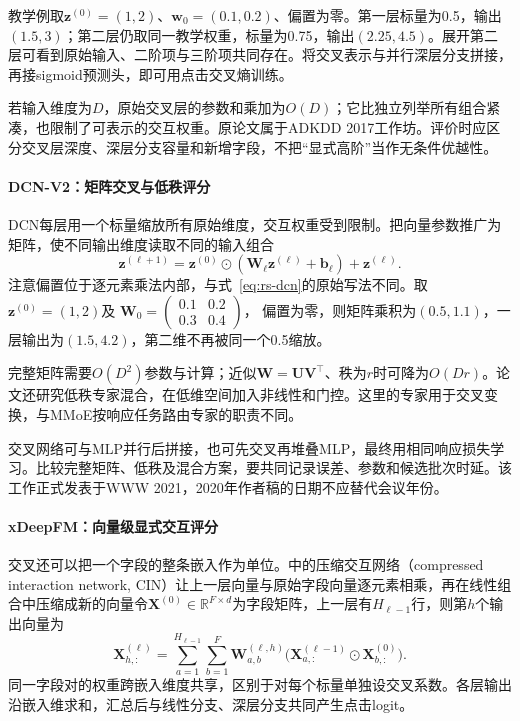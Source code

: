 教学例取$\bm z^{(0)}=(1,2)$、$\bm w_0=(0.1,0.2)$、偏置为零。第一层标量为0.5，输出$(1.5,3)$；第二层仍取同一教学权重，标量为0.75，输出$(2.25,4.5)$。展开第二层可看到原始输入、二阶项与三阶项共同存在。将交叉表示与并行深层分支拼接，再接sigmoid预测头，即可用点击交叉熵训练。

若输入维度为$D$，原始交叉层的参数和乘加为$O(D)$；它比独立列举所有组合紧凑，也限制了可表示的交互权重。原论文属于ADKDD 2017工作坊。评价时应区分交叉层深度、深层分支容量和新增字段，不把“显式高阶”当作无条件优越性。

\paragraph{DCN-V2：矩阵交叉与低秩评分}
\label{sec:rs-dcn-v2}

DCN每层用一个标量缩放所有原始维度，交互权重受到限制。把向量参数推广为矩阵，使不同输出维度读取不同的输入组合
\begin{equation}
 \bm z^{(\ell+1)}
 =\bm z^{(0)}\odot(\bm W_\ell\bm z^{(\ell)}+\bm b_\ell)
  +\bm z^{(\ell)}.
 \label{eq:rs-dcn-v2}
\end{equation}
注意偏置位于逐元素乘法内部，与式~\eqref{eq:rs-dcn}的原始写法不同。取$\bm z^{(0)}=(1,2)$及
$\bm W_0=\left(\begin{smallmatrix}0.1&0.2\\0.3&0.4\end{smallmatrix}\right)$，
偏置为零，则矩阵乘积为$(0.5,1.1)$，一层输出为$(1.5,4.2)$，第二维不再被同一个0.5缩放。

完整矩阵需要$O(D^2)$参数与计算；近似$\bm W=\bm U\bm V^\top$、秩为$r$时可降为$O(Dr)$。论文还研究低秩专家混合，在低维空间加入非线性和门控。这里的专家用于交叉变换，与MMoE按响应任务路由专家的职责不同。

交叉网络可与MLP并行后拼接，也可先交叉再堆叠MLP，最终用相同响应损失学习。比较完整矩阵、低秩及混合方案，要共同记录误差、参数和候选批次时延。该工作正式发表于WWW 2021，2020年作者稿的日期不应替代会议年份。

\paragraph{xDeepFM：向量级显式交互评分}
\label{sec:rs-xdeepfm}

交叉还可以把一个字段的整条嵌入作为单位。中的压缩交互网络（compressed interaction network, CIN）让上一层向量与原始字段向量逐元素相乘，再在线性组合中压缩成新的向量令$\bm X^{(0)}\in\mathbb R^{F\times d}$为字段矩阵，上一层有$H_{\ell-1}$行，则第$h$个输出向量为
\begin{equation}
 \bm X^{(\ell)}_{h,:}
 =\sum_{a=1}^{H_{\ell-1}}\sum_{b=1}^{F}
   \bm W^{(\ell,h)}_{a,b}
   \bigl(\bm X^{(\ell-1)}_{a,:}\odot\bm X^{(0)}_{b,:}\bigr).
 \label{eq:rs-cin}
\end{equation}
同一字段对的权重跨嵌入维度共享，区别于对每个标量单独设交叉系数。各层输出沿嵌入维求和，汇总后与线性分支、深层分支共同产生点击logit。

